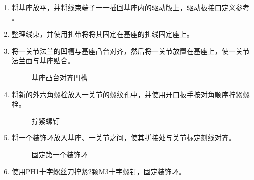 \documentclass[a4paper,11pt,english,openany,oneside]{sphinxmanual}
\begin{document}
\begin{enumerate}
\begin{figure}[H]
\noindent{}
\caption{机器人连接线放入固线套}\label{\detokenize{_u66f4_u6362_u57fa_u5ea7:id22}}\end{figure}

\item {} 
\sphinxAtStartPar
将基座放平，并将线束端子一一插回基座内的驱动版上，驱动板接口定义参考 {\hyperref[\detokenize{_u66f4_u6362_u57fa_u5ea7:id3}]{}} 。

\item {} 
\sphinxAtStartPar
整理线束，并使用扎带将将其固定在基座的扎线固定座上。

\item {} 
\sphinxAtStartPar
将一关节法兰的凹槽与基座凸台对齐，然后将一关节放置在基座上，使一关节法兰面与基座贴合。

\begin{figure}[H]
\centering
\capstart

\noindent{}
\caption{基座凸台对齐凹槽}\label{\detokenize{_u66f4_u6362_u57fa_u5ea7:id23}}\end{figure}

\item {} 
\sphinxAtStartPar
将新的外六角螺栓放入一关节的螺纹孔中，并使用开口扳手按对角顺序拧紧螺栓。

\begin{figure}[H]
\centering
\capstart

\noindent{}
\caption{拧紧螺钉}\label{\detokenize{_u66f4_u6362_u57fa_u5ea7:id24}}\end{figure}

\item {} 
\sphinxAtStartPar
将一个装饰环放入基座、一关节之间，使其拼接处与关节标定刻线对齐。

\begin{figure}[H]
\centering
\capstart

\noindent{}
\caption{固定第一个装饰环}\label{\detokenize{_u66f4_u6362_u57fa_u5ea7:id25}}\end{figure}

\item {} 
\sphinxAtStartPar
使用PH1十字螺丝刀拧紧2颗M3十字螺钉，固定装饰环。

\begin{figure}[H]
\centering
\capstart


\end{figure}
\end{enumerate}
\end{document}

